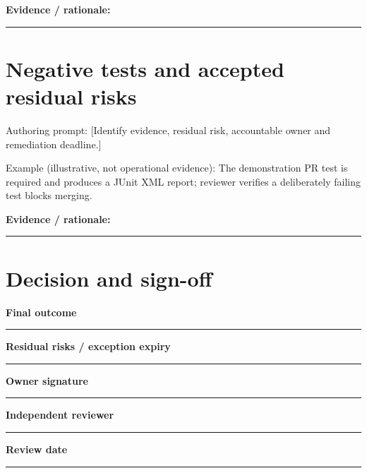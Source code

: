 \documentclass[11pt,letterpaper]{article}
\begin{document}
\noindent\textbf{Evidence / rationale:}\par\nobreak\vspace{8pt}\noindent\rule{0.93\linewidth}{0.4pt}\par\vspace{14pt}
\section{Negative tests and accepted residual risks}
Authoring prompt: [Identify evidence, residual risk, accountable owner and remediation deadline.]

Example (illustrative, not operational evidence): The demonstration PR test is required and produces a JUnit XML report; reviewer verifies a deliberately failing test blocks merging.

\noindent\textbf{Evidence / rationale:}\par\nobreak\vspace{8pt}\noindent\rule{0.93\linewidth}{0.4pt}\par\vspace{14pt}
\section{Decision and sign-off}
\noindent\textbf{Final outcome}\par\nobreak\vspace{6pt}\noindent\rule{0.93\linewidth}{0.4pt}\par\vspace{14pt}
\noindent\textbf{Residual risks / exception expiry}\par\nobreak\vspace{6pt}\noindent\rule{0.93\linewidth}{0.4pt}\par\vspace{14pt}
\noindent\textbf{Owner signature}\par\nobreak\vspace{6pt}\noindent\rule{0.93\linewidth}{0.4pt}\par\vspace{14pt}
\noindent\textbf{Independent reviewer}\par\nobreak\vspace{6pt}\noindent\rule{0.93\linewidth}{0.4pt}\par\vspace{14pt}
\noindent\textbf{Review date}\par\nobreak\vspace{6pt}\noindent\rule{0.93\linewidth}{0.4pt}\par\vspace{14pt}
\end{document}
